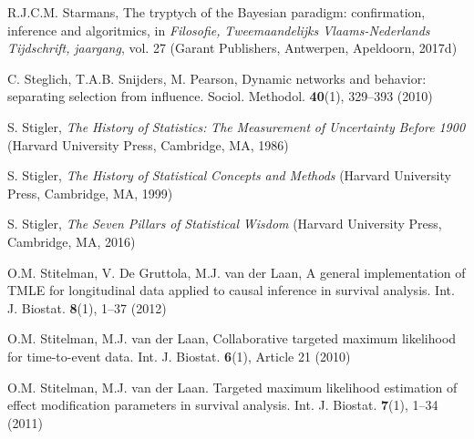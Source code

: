 \begin{list}{}{\setlength{\leftmargin}{2.1em}\setlength{\labelwidth}{0pt}
  \setlength{\labelsep}{0pt}\setlength{\itemindent}{-2.1em}
  \setlength{\parsep}{0pt}\setlength{\itemsep}{2pt}\setlength{\topsep}{0pt}}
\item\label{refentry:REF384}R.J.C.M. Starmans, The tryptych of the Bayesian paradigm: confirmation, inference and algoritmics, in \textit{Filosofie,} \textit{Tweemaandelijks} \textit{Vlaams-Nederlands} \textit{Tijdschrift,} \textit{jaargang}, vol. 27 (Garant Publishers, Antwerpen, Apeldoorn, 2017d)\label{refend:REF384}
\item\label{refentry:REF385}C. Steglich, T.A.B. Snijders, M. Pearson, Dynamic networks and behavior: separating selection from influence. Sociol. Methodol. \textbf{40}(1), 329--393 (2010)\label{refend:REF385}
\item\label{refentry:REF386}S. Stigler, \textit{The} \textit{History} \textit{of} \textit{Statistics:} \textit{The} \textit{Measurement} \textit{of} \textit{Uncertainty} \textit{Before} \textit{1900} (Harvard University Press, Cambridge, MA, 1986)\label{refend:REF386}
\item\label{refentry:REF387}S. Stigler, \textit{The} \textit{History} \textit{of} \textit{Statistical} \textit{Concepts} \textit{and} \textit{Methods} (Harvard University Press, Cambridge, MA, 1999)\label{refend:REF387}
\item\label{refentry:REF388}S. Stigler, \textit{The} \textit{Seven} \textit{Pillars} \textit{of} \textit{Statistical} \textit{Wisdom} (Harvard University Press, Cambridge, MA, 2016)\label{refend:REF388}
\item\label{refentry:REF389}O.M. Stitelman, V. De Gruttola, M.J. van der Laan, A general implementation of TMLE for longitudinal data applied to causal inference in survival analysis. Int. J. Biostat. \textbf{8}(1), 1--37 (2012)\label{refend:REF389}
\item\label{refentry:REF390}O.M. Stitelman, M.J. van der Laan, Collaborative targeted maximum likelihood for time-to-event data. Int. J. Biostat. \textbf{6}(1), Article 21 (2010)\label{refend:REF390}
\item\label{refentry:REF391}O.M. Stitelman, M.J. van der Laan. Targeted maximum likelihood estimation of effect modification parameters in survival analysis. Int. J. Biostat. \textbf{7}(1), 1--34 (2011)\label{refend:REF391}

\end{list}
